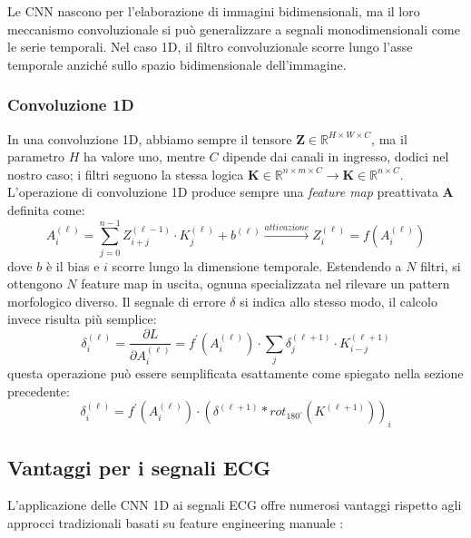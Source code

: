 Le CNN nascono per l'elaborazione di immagini bidimensionali, ma il loro meccanismo convoluzionale si può generalizzare a segnali monodimensionali come le serie temporali. Nel caso 1D, il filtro convoluzionale scorre lungo l'asse temporale anziché sullo spazio bidimensionale dell'immagine.

\subsubsection{Convoluzione 1D}

In una convoluzione 1D, abbiamo sempre il tensore $\mathbf{Z}\in\mathbb{R}^{H\times W\times C}$, ma il parametro $H$ ha valore uno, mentre $C$ dipende dai canali in ingresso, dodici nel nostro caso; i filtri seguono la stessa logica $\mathbf{K}\in\mathbb{R}^{n\times m\times C}\to\mathbf{K}\in\mathbb{R}^{n\times C}$. L'operazione di convoluzione 1D produce sempre una \emph{feature map} preattivata $\mathbf{A}$ definita come:
\[
A_i^{(\ell)}=\sum_{j=0}^{n-1}Z_{i+j}^{(\ell-1)}\cdot K_j^{(\ell)}+b^{(\ell)}\xrightarrow{attivazione}Z_i^{(\ell)}=f\left(A_i^{(\ell)}\right)
\]
dove $b$ è il bias e $i$ scorre lungo la dimensione temporale. Estendendo a $N$ filtri, si ottengono $N$ feature map in uscita, ognuna specializzata nel rilevare un pattern morfologico diverso. Il segnale di errore $\delta$ si indica allo stesso modo, il calcolo invece risulta più semplice:
\[
\delta_i^{(\ell)}=\frac{\partial L}{\partial A_i^{(\ell)}}=f^{'}\left(A_i^{(\ell)}\right)\cdot \sum_j\delta^{(\ell+1)}_j\cdot K^{(\ell+1)}_{i-j}
\]
questa operazione può essere semplificata esattamente come spiegato nella sezione precedente:
\[
\delta^{(\ell)}_i=f^{'}\left(A^{(\ell)}_i\right)\cdot \left(\delta^{(\ell+1)}*rot_{180^{\circ}}\left(K^{(\ell +1)}\right)\right)_i
\]

\subsection{Vantaggi per i segnali ECG}

L'applicazione delle CNN 1D ai segnali ECG offre numerosi vantaggi rispetto agli approcci tradizionali basati su feature engineering manuale \cite{hannun2019cardiologist}:

